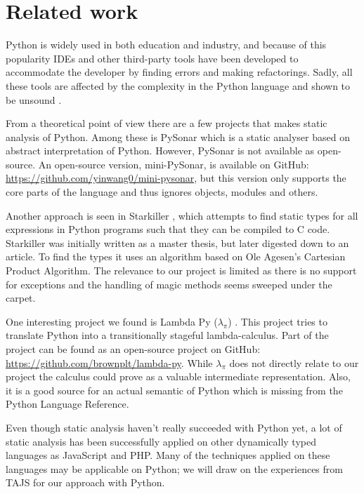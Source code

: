 \section{Related work}
Python is widely used in both education and industry, and because of this popularity IDEs \cite{ide.appcelerator, ide.jetbrains, ide.wingware} and other third-party tools \cite{tool.pep8, tool.pyflakes, tool.pychecker, tool.pylint} have been developed to accommodate the developer by finding errors and making refactorings. Sadly, all these tools are affected by the complexity in the Python language and shown to be unsound \cite{lamdapy}.

From a theoretical point of view there are a few projects that makes static analysis of Python. Among these is PySonar \cite{pysonar} which is a static analyser based on abstract interpretation of Python. However, PySonar is not available as open-source. An open-source version, mini-PySonar, is available on GitHub: \url{https://github.com/yinwang0/mini-pysonar}, but this version only supports the core parts of the language and thus ignores objects, modules and others.

Another approach is seen in Starkiller \cite{starkiller}, which attempts to find static types for all expressions in Python programs such that they can be compiled to C code. Starkiller was initially written as a master thesis, but later digested down to an article. To find the types it uses an algorithm based on Ole Agesen’s Cartesian Product Algorithm. The relevance to our project is limited as there is no support for exceptions and the handling of magic methods seems sweeped under the carpet.

One interesting project we found is Lambda Py ($\lambda_{\pi}$) \cite{lambdapy}. This project tries to translate Python into a transitionally stageful lambda-calculus. Part of the project can be found as an open-source project on GitHub: \url{https://github.com/brownplt/lambda-py}. While $\lambda_{\pi}$ does not directly relate to our project the calculus could prove as a valuable intermediate representation. Also, it is a good source for an actual semantic of Python which is missing from the Python Language Reference.

Even though static analysis haven't really succeeded with Python yet, a lot of static analysis has been successfully applied on other dynamically typed languages as JavaScript and PHP. Many of the techniques applied on these languages may be applicable on Python; we will draw on the experiences from TAJS \cite{tajs} for our approach with Python.


